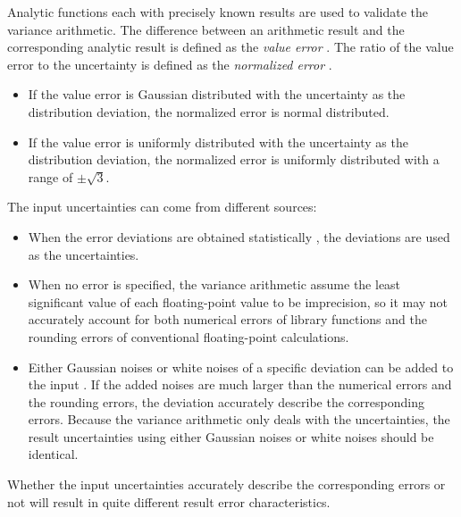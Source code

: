 \documentclass[twoside]{article}
\numberwithin{equation}{section}
\begin{document}
Analytic functions each with precisely known results are used to validate the variance arithmetic. 
The difference between an arithmetic result and the corresponding analytic result is defined as the \emph{value error} \cite{Prev_Precision_Arithmetic}.
The ratio of the value error to the uncertainty is defined as the \emph{normalized error} \cite{Prev_Precision_Arithmetic}.
\begin{itemize}
\item If the value error is Gaussian distributed with the uncertainty as the distribution deviation, the normalized error is normal distributed.

\item If the value error is uniformly distributed with the uncertainty as the distribution deviation, the normalized error is uniformly distributed with a range of $\pm \sqrt{3}$.
\end{itemize}

The input uncertainties can come from different sources:
\begin{itemize}
\item When the error deviations are obtained statistically \cite{Statistical_Methods}, the deviations are used as the uncertainties. 

\item When no error is specified, the variance arithmetic assume the least significant value of each floating-point value to be imprecision, so it may not accurately account for both numerical errors of library functions and the rounding errors of conventional floating-point calculations.

\item Either Gaussian noises or white noises \cite{Probability_Statistics} of a specific deviation can be added to the input \cite{Prev_Precision_Arithmetic}.
If the added noises are much larger than the numerical errors and the rounding errors, the deviation accurately describe the corresponding errors.
Because the variance arithmetic only deals with the uncertainties, the result uncertainties using either Gaussian noises or white noises should be identical.
\end{itemize}
Whether the input uncertainties accurately describe the corresponding errors or not will result in quite different result error characteristics.
\end{document}
